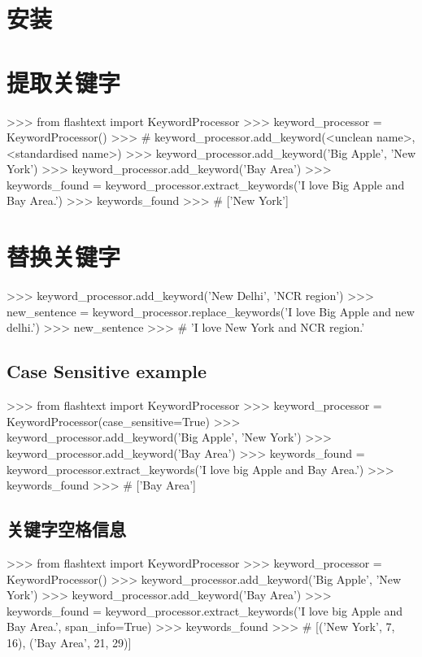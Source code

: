 \documentclass{article}
\begin{document}
\section{安装}
\section{提取关键字}
\begin{ipythoncode}
>>> from flashtext import KeywordProcessor
>>> keyword_processor = KeywordProcessor()
>>> # keyword_processor.add_keyword(<unclean name>, <standardised name>)
>>> keyword_processor.add_keyword('Big Apple', 'New York')
>>> keyword_processor.add_keyword('Bay Area')
>>> keywords_found = keyword_processor.extract_keywords('I love Big Apple and Bay Area.')
>>> keywords_found
>>> # ['New York']
\end{ipythoncode}
\section{替换关键字}
\begin{ipythoncode}

>>> keyword_processor.add_keyword('New Delhi', 'NCR region')
>>> new_sentence = keyword_processor.replace_keywords('I love Big Apple and new delhi.')
>>> new_sentence
>>> # 'I love New York and NCR region.'
\end{ipythoncode}

\subsection{Case Sensitive example}
\begin{ipythoncode}
>>> from flashtext import KeywordProcessor
>>> keyword_processor = KeywordProcessor(case_sensitive=True)
>>> keyword_processor.add_keyword('Big Apple', 'New York')
>>> keyword_processor.add_keyword('Bay Area')
>>> keywords_found = keyword_processor.extract_keywords('I love big Apple and Bay Area.')
>>> keywords_found
>>> # ['Bay Area']
\end{ipythoncode}

\subsection{关键字空格信息}
\begin{ipythoncode}

>>> from flashtext import KeywordProcessor
>>> keyword_processor = KeywordProcessor()
>>> keyword_processor.add_keyword('Big Apple', 'New York')
>>> keyword_processor.add_keyword('Bay Area')
>>> keywords_found = keyword_processor.extract_keywords('I love big Apple and Bay Area.', span_info=True)
>>> keywords_found
>>> # [('New York', 7, 16), ('Bay Area', 21, 29)]
\end{ipythoncode}
\end{document}
